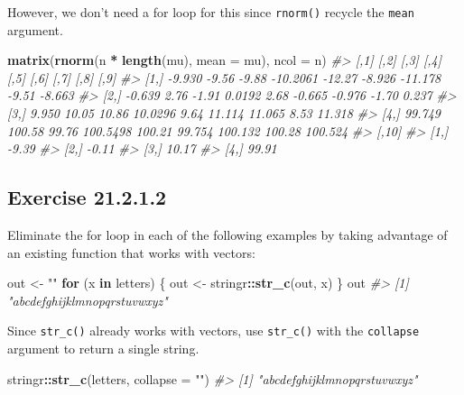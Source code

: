 \documentclass[]{book}
\newenvironment{Shaded}{\begin{snugshade}}{\end{snugshade}}
\newcommand{\CommentTok}[1]{\textcolor[rgb]{0.56,0.35,0.01}{\textit{#1}}}
\newcommand{\ControlFlowTok}[1]{\textcolor[rgb]{0.13,0.29,0.53}{\textbf{#1}}}
\newcommand{\DataTypeTok}[1]{\textcolor[rgb]{0.13,0.29,0.53}{#1}}
\newcommand{\KeywordTok}[1]{\textcolor[rgb]{0.13,0.29,0.53}{\textbf{#1}}}
\newcommand{\NormalTok}[1]{#1}
\newcommand{\OperatorTok}[1]{\textcolor[rgb]{0.81,0.36,0.00}{\textbf{#1}}}
\newcommand{\StringTok}[1]{\textcolor[rgb]{0.31,0.60,0.02}{#1}}
\theoremstyle{plain}
\theoremstyle{remark}
\begin{document}
However, we don't need a for loop for this since \texttt{rnorm()}
recycle the \texttt{mean} argument.

\begin{Shaded}
\begin{Highlighting}[]
\KeywordTok{matrix}\NormalTok{(}\KeywordTok{rnorm}\NormalTok{(n }\OperatorTok{*}\StringTok{ }\KeywordTok{length}\NormalTok{(mu), }\DataTypeTok{mean =}\NormalTok{ mu), }\DataTypeTok{ncol =}\NormalTok{ n)}
\CommentTok{#>        [,1]   [,2]  [,3]     [,4]   [,5]   [,6]    [,7]   [,8]    [,9]}
\CommentTok{#> [1,] -9.930  -9.56 -9.88 -10.2061 -12.27 -8.926 -11.178  -9.51  -8.663}
\CommentTok{#> [2,] -0.639   2.76 -1.91   0.0192   2.68 -0.665  -0.976  -1.70   0.237}
\CommentTok{#> [3,]  9.950  10.05 10.86  10.0296   9.64 11.114  11.065   8.53  11.318}
\CommentTok{#> [4,] 99.749 100.58 99.76 100.5498 100.21 99.754 100.132 100.28 100.524}
\CommentTok{#>      [,10]}
\CommentTok{#> [1,] -9.39}
\CommentTok{#> [2,] -0.11}
\CommentTok{#> [3,] 10.17}
\CommentTok{#> [4,] 99.91}
\end{Highlighting}
\end{Shaded}

\hypertarget{exercise-21.2.1.2}{%
\subsection*{\texorpdfstring{Exercise
{21.2.1.2}}{Exercise 21.2.1.2}}\label{exercise-21.2.1.2}}

Eliminate the for loop in each of the following examples by taking
advantage of an existing function that works with vectors:

\begin{Shaded}
\begin{Highlighting}[]
\NormalTok{out <-}\StringTok{ ""}
\ControlFlowTok{for}\NormalTok{ (x }\ControlFlowTok{in}\NormalTok{ letters) \{}
\NormalTok{  out <-}\StringTok{ }\NormalTok{stringr}\OperatorTok{::}\KeywordTok{str_c}\NormalTok{(out, x)}
\NormalTok{\}}
\NormalTok{out}
\CommentTok{#> [1] "abcdefghijklmnopqrstuvwxyz"}
\end{Highlighting}
\end{Shaded}

Since \texttt{str\_c()} already works with vectors, use
\texttt{str\_c()} with the \texttt{collapse} argument to return a single
string.

\begin{Shaded}
\begin{Highlighting}[]
\NormalTok{stringr}\OperatorTok{::}\KeywordTok{str_c}\NormalTok{(letters, }\DataTypeTok{collapse =} \StringTok{""}\NormalTok{)}
\CommentTok{#> [1] "abcdefghijklmnopqrstuvwxyz"}
\end{Highlighting}
\end{Shaded}
\end{document}
